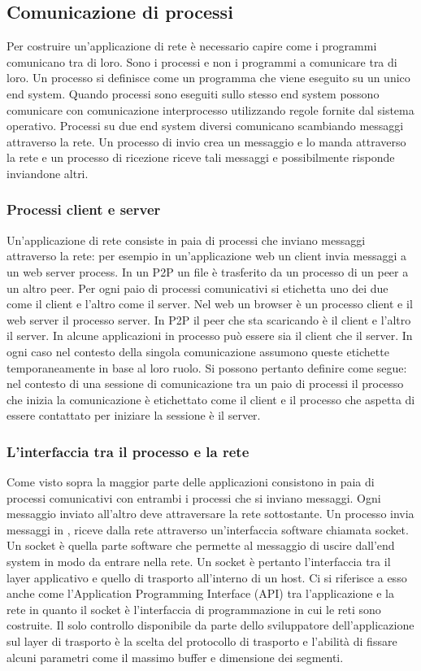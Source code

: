 \subsection{Comunicazione di processi}
Per costruire un'applicazione di rete \`e necessario capire come i programmi comunicano tra di loro. Sono i processi e non i programmi a comunicare tra di loro. Un processo si definisce come un programma che
viene eseguito su un unico end system. Quando processi sono eseguiti sullo stesso end system possono comunicare con comunicazione interprocesso utilizzando regole fornite dal sistema operativo. Processi
su due end system diversi comunicano scambiando messaggi attraverso la rete. Un processo di invio crea un messaggio e lo manda attraverso la rete e un processo di ricezione riceve tali messaggi e 
possibilmente risponde inviandone altri. 
\subsubsection{Processi client e server}
Un'applicazione di rete consiste in paia di processi che inviano messaggi attraverso la rete: per esempio in un'applicazione web un client invia messaggi a un web server process. In un P2P un file \`e trasferito da 
un processo di un peer a un altro peer. Per ogni paio di processi comunicativi si etichetta uno dei due come il client e l'altro come il server. Nel web un browser \`e un processo client e il web server il processo 
server. In P2P il peer che sta scaricando \`e il client e l'altro il server. In alcune applicazioni in processo pu\`o essere sia il client che il server. In ogni caso nel contesto della singola comunicazione assumono 
queste etichette temporaneamente in base al loro ruolo. Si possono pertanto definire come segue: nel contesto di una sessione di comunicazione tra un paio di processi il processo che inizia la comunicazione \`e 
etichettato come il client e il processo che aspetta di essere contattato per iniziare la sessione \`e il server. 
\subsubsection{L'interfaccia tra il processo e la rete}
Come visto sopra la maggior parte delle applicazioni consistono in paia di processi comunicativi con entrambi i processi che si inviano messaggi. Ogni messaggio inviato all'altro deve attraversare la rete 
sottostante. Un processo invia messaggi in , riceve dalla rete attraverso un'interfaccia software chiamata socket. Un socket \`e quella parte software che permette al messaggio di uscire dall'end system in modo
da entrare nella rete. Un socket \`e pertanto l'interfaccia tra il layer applicativo e quello di trasporto all'interno di un host. Ci si riferisce a esso anche come l'Application Programming Interface (API) tra 
l'applicazione e la rete in quanto il socket \`e l'interfaccia di programmazione in cui le reti sono costruite. Il solo controllo disponibile da parte dello sviluppatore dell'applicazione sul layer di trasporto \`e la
scelta del protocollo di trasporto e l'abilit\`a di fissare alcuni parametri come il massimo buffer e dimensione dei segmenti. 
